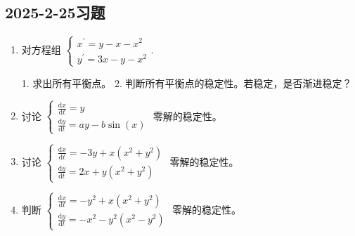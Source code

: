 \subsection{2025-2-25习题}

\begin{enumerate}
    \item 对方程组 $\begin{cases} x^{\prime}=y-x-x^{2}\\ y^{\prime}=3x-y-x^{2}\end{cases}.$

    1. 求出所有平衡点。
    2. 判断所有平衡点的稳定性。若稳定，是否渐进稳定？
    \item 讨论 $\begin{cases}\frac{\mathrm{d}x}{\mathrm{d}t}=y\\ \frac{\mathrm{d}y}{\mathrm{d}t}=ay-b\sin(x)\end{cases}$ 零解的稳定性。
    \item 讨论 $\begin{cases} \frac{\mathrm{d}x}{\mathrm{d}t}=-3y+x(x^{2}+y^{2})\\ \frac{\mathrm{d}y}{\mathrm{d}t}=2x+y(x^{2}+y^{2})\end{cases}$ 零解的稳定性。
    \item 判断 $\begin{cases} \frac{\mathrm{d}x}{\mathrm{d}t}=-y^{2}+x(x^{2}+y^{2})\\ \frac{\mathrm{d}y}{\mathrm{d}t}=-x^{2}-y^{2}(x^{2}-y^{2})\end{cases}$ 零解的稳定性。
\end{enumerate}